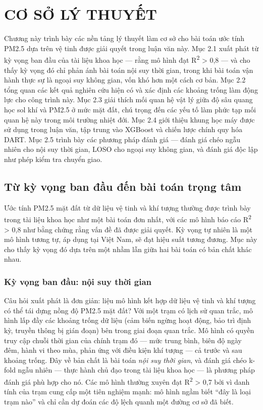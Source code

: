 \chapter{CƠ SỞ LÝ THUYẾT}
\label{chuong2}


Chương này trình bày các nền tảng lý thuyết làm cơ sở cho bài toán ước tính PM2.5 dựa trên vệ tinh được giải quyết trong luận văn này. Mục 2.1 xuất phát từ kỳ vọng ban đầu của tài liệu khoa học --- rằng mô hình đạt R\textsuperscript{2} > 0,8 --- và cho thấy kỳ vọng đó chỉ phản ánh bài toán nội suy thời gian, trong khi bài toán vận hành thực sự là ngoại suy không gian, vốn khó hơn một cách cơ bản. Mục 2.2 tổng quan các kết quả nghiên cứu hiện có và xác định các khoảng trống làm động lực cho công trình này. Mục 2.3 giải thích mối quan hệ vật lý giữa độ sâu quang học sol khí và PM2.5 ở mức mặt đất, chú trọng đến các yếu tố làm phức tạp mối quan hệ này trong môi trường nhiệt đới. Mục 2.4 giới thiệu khung học máy được sử dụng trong luận văn, tập trung vào XGBoost và chiến lược chính quy hóa DART. Mục 2.5 trình bày các phương pháp đánh giá --- đánh giá chéo ngẫu nhiên cho nội suy thời gian, LOSO cho ngoại suy không gian, và đánh giá độc lập như phép kiểm tra chuyển giao.


\section{Từ kỳ vọng ban đầu đến bài toán trọng tâm}

Ước tính PM2.5 mặt đất từ dữ liệu vệ tinh và khí tượng thường được trình bày trong tài liệu khoa học như một bài toán đơn nhất, với các mô hình báo cáo R\textsuperscript{2} > 0,8 như bằng chứng rằng vấn đề đã được giải quyết. Kỳ vọng tự nhiên là một mô hình tương tự, áp dụng tại Việt Nam, sẽ đạt hiệu suất tương đương. Mục này cho thấy kỳ vọng đó dựa trên một nhầm lẫn giữa hai bài toán có bản chất khác nhau.

\subsection{Kỳ vọng ban đầu: nội suy thời gian}

Câu hỏi xuất phát là đơn giản: liệu mô hình kết hợp dữ liệu vệ tinh và khí tượng có thể tái dựng nồng độ PM2.5 mặt đất? Với một trạm có lịch sử quan trắc, mô hình lấp đầy các khoảng trống dữ liệu (cảm biến ngừng hoạt động, bảo trì định kỳ, truyền thông bị gián đoạn) bên trong giai đoạn quan trắc. Mô hình có quyền truy cập chuỗi thời gian của chính trạm đó --- mức trung bình, biên độ ngày đêm, hành vi theo mùa, phản ứng với điều kiện khí tượng --- cả trước và sau khoảng trống. Đây về bản chất là bài toán \emph{nội suy thời gian}, và đánh giá chéo k-fold ngẫu nhiên --- thực hành chủ đạo trong tài liệu khoa học --- là phương pháp đánh giá phù hợp cho nó. Các mô hình thường xuyên đạt R\textsuperscript{2} > 0,7 bởi vì danh tính của trạm cung cấp một tiên nghiệm mạnh: mô hình ngầm biết ``đây là loại trạm nào'' và chỉ cần dự đoán các độ lệch quanh một đường cơ sở đã biết.

